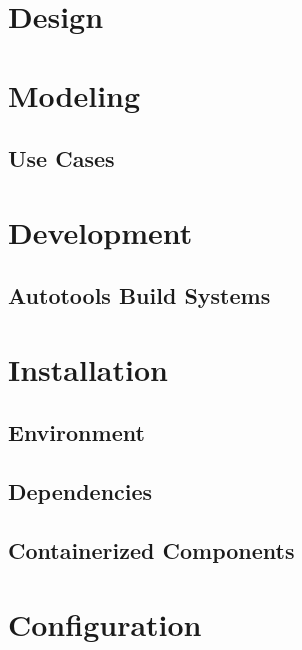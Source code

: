 \documentclass[11pt]{article}
\begin{document}
  \section{Design}\label{sec:dsg}

  \section{Modeling}\label{sec:mod}

    \subsection{Use Cases}\label{sec:mod-use}


  \section{Development}\label{sec:dev}

    \subsection{Autotools Build Systems}\label{sec:dev-ac}

  \section{Installation}\label{sec:inst}

    \subsection{Environment}\label{sec:inst-env}

    \subsection{Dependencies}\label{sec:inst-dep}

    \subsection{Containerized Components}\label{sec:inst-cont}

  \section{Configuration}\label{sec:cfg}
\end{document}
